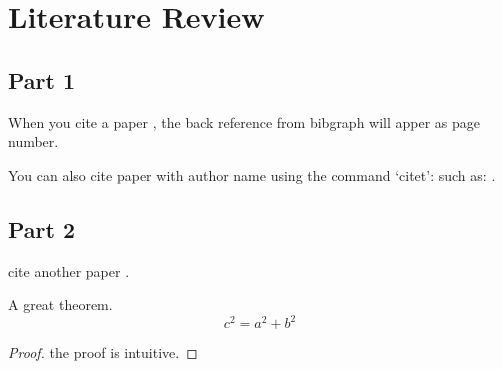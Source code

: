 
\chapter{Literature Review} %
\label{ch:literature_review} %


\section{Part 1}

When you cite a paper \cite{bauschke2011convex}, the back reference from bibgraph will apper as page number.

You can also cite paper with author name using the command `citet': such as: \citet{bauschke2011convex}.

\section{Part 2}

cite another paper \cite{DynamicOptim_Opportunities_challenges}.

\begin{theorem}[My theorem]
	A great theorem.
	\begin{equation}
		c^2=a^2+b^2
	\end{equation}
\end{theorem}

\begin{proof}
	the proof is intuitive.
\end{proof}
